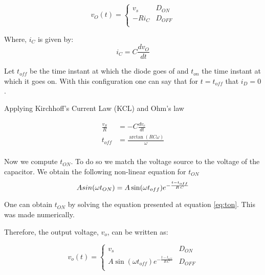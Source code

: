 \begin{equation}
	v_O(t) = \left\{
	\begin{array}{ll}
		v_s & D_{ON} \\
	 -R i_C & D_{OFF}\\
  \end{array}
\right.
\end{equation}

Where, $i_C$ is given by:
\begin{equation}
  i_C=C \frac{d v_O}{dt}
\end{equation}

Let $t_{off}$ be the time instant at which the diode goes of and $t_{on}$ the time instant at which it goes on. With this configuration one can say that for $t=t_{off}$ that $i_D=0$.


Applying Kirchhoff's Current Law (KCL) and Ohm's law

\begin{equation}
\begin{split}
  \frac{v_S}{R} &=-C\frac{dv_c}{dt}\\
  t_{off} &=\frac{\arctan(RC\omega)}{\omega}\\
\end{split}
\end{equation}



Now we compute $t_{ON}$. To do so we match the voltage source to the voltage of the capacitor. We obtain the following non-linear equation for $t_{ON}$
\begin{equation}
	A sin(\omega t_{ON}) =A  \sin(\omega t_{off})  e^{-\frac{t-t_{off}}{R\,C}}\\
\label{eq:ton}
\end{equation}

One can obtain $t_{ON}$ by solving the equation presented at equation \ref{eq:ton}. This was made numerically.

Therefore, the output voltage, $v_o$, can be written as:

\begin{equation}
	v_o(t) = \left\{
\begin{array}{ll}
	v_s & D_{ON} \\
	A  \sin(\omega t_{off})  e^{-\frac{t-t_{off}}{R\,C}} & D_{OFF}\\
\end{array}
\right.
\end{equation}


